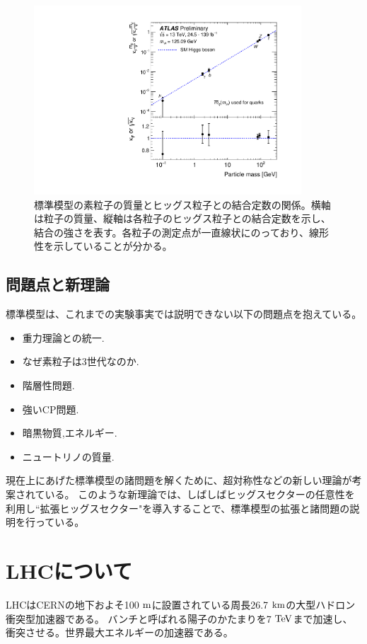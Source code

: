\begin{figure}[bpt]\centering
\includegraphics[width=10cm,angle=270]{./kappa_vs_mass.pdf}
\caption[標準模型の素粒子の質量とヒッグス粒子との結合定数の関係]{標準模型の素粒子の質量とヒッグス粒子との結合定数の関係\cite{1-10}。横軸は粒子の質量、縦軸は各粒子のヒッグス粒子との結合定数を示し、結合の強さを表す。各粒子の測定点が一直線状にのっており、線形性を示していることが分かる。}
\label{kappa_vs_mass}
\end{figure}

\subsection{問題点と新理論}
標準模型は、これまでの実験事実では説明できない以下の問題点を抱えている。
\begin{itemize}
  \item 重力理論との統一.
  \item なぜ素粒子は3世代なのか.
  \item 階層性問題.
  \item 強いCP問題.
  \item 暗黒物質,エネルギー.
  \item ニュートリノの質量.
\end{itemize}

現在上にあげた標準模型の諸問題を解くために、超対称性\cite{1-11}などの新しい理論が考案されている。
このような新理論では、しばしばヒッグスセクターの任意性を利用し``拡張ヒッグスセクター"を導入することで、標準模型の拡張と諸問題の説明を行っている。

\clearpage
\section{LHCについて}
LHCはCERNの地下およそ100 $\rm{m}$に設置されている周長26.7 $\rm{km}$の大型ハドロン衝突型加速器である。
バンチと呼ばれる陽子のかたまりを7 $\rm{TeV}$まで加速し、衝突させる。世界最大エネルギーの加速器である。

